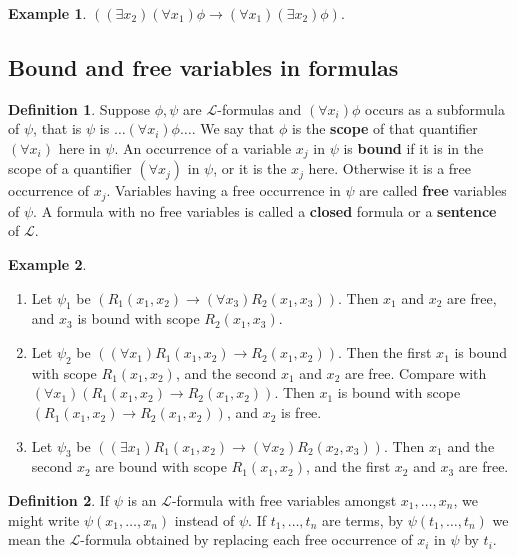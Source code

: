 \documentclass{article}
\renewcommand{\L}{\mathcal{L}}
\newcommand{\rb}[1]{\left( #1 \right)}
\newcommand{\impb}[2]{\rb{#1 \rightarrow #2}}
\newcommand{\fab}[1]{\rb{\forall #1}}
\newcommand{\teb}[1]{\rb{\exists #1}}
\theoremstyle{definition}\newtheorem{definition}{Definition}[subsection]
\theoremstyle{definition}\newtheorem{remark}[definition]{Remark}
\theoremstyle{definition}\newtheorem*{example}{Example}
\theoremstyle{definition}\newtheorem*{note}{Note}
\begin{document}
\begin{example}
$ \impb{\teb{x_2}\fab{x_1}\phi}{\fab{x_1}\teb{x_2}\phi} $.
\end{example}

\subsection{Bound and free variables in formulas}

\begin{definition}
Suppose $ \phi, \psi $ are $ \L $-formulas and $ \fab{x_i}\phi $ occurs as a subformula of $ \psi $, that is $ \psi $ is $ \dots \fab{x_i}\phi \dots $. We say that $ \phi $ is the \textbf{scope} of that quantifier $ \fab{x_i} $ here in $ \psi $. An occurrence of a variable $ x_j $ in $ \psi $ is \textbf{bound} if it is in the scope of a quantifier $ \fab{x_j} $ in $ \psi $, or it is the $ x_j $ here. Otherwise it is a free occurrence of $ x_j $. Variables having a free occurrence in $ \psi $ are called \textbf{free} variables of $ \psi $. A formula with no free variables is called a \textbf{closed} formula or a \textbf{sentence} of $ \L $.
\end{definition}

\begin{example}
\hfill
\begin{enumerate}
\item Let $ \psi_1 $ be $ \impb{R_1\rb{x_1, x_2}}{\fab{x_3}R_2\rb{x_1, x_3}} $. Then $ x_1 $ and $ x_2 $ are free, and $ x_3 $ is bound with scope $ R_2\rb{x_1, x_3} $.
\item Let $ \psi_2 $ be $ \impb{\fab{x_1}R_1\rb{x_1, x_2}}{R_2\rb{x_1, x_2}} $. Then the first $ x_1 $ is bound with scope $ R_1\rb{x_1, x_2} $, and the second $ x_1 $ and $ x_2 $ are free. Compare with $ \fab{x_1}\impb{R_1\rb{x_1, x_2}}{R_2\rb{x_1, x_2}} $. Then $ x_1 $ is bound with scope $ \impb{R_1\rb{x_1, x_2}}{R_2\rb{x_1, x_2}} $, and $ x_2 $ is free.
\item Let $ \psi_3 $ be $ \impb{\teb{x_1}R_1\rb{x_1, x_2}}{\fab{x_2}R_2\rb{x_2, x_3}} $. Then $ x_1 $ and the second $ x_2 $ are bound with scope $ R_1\rb{x_1, x_2} $, and the first $ x_2 $ and $ x_3 $ are free.
\end{enumerate}
\end{example}

\begin{definition}
If $ \psi $ is an $ \L $-formula with free variables amongst $ x_1, \dots, x_n $, we might write $ \psi\rb{x_1, \dots, x_n} $ instead of $ \psi $. If $ t_1, \dots, t_n $ are terms, by $ \psi\rb{t_1, \dots, t_n} $ we mean the $ \L $-formula obtained by replacing each free occurrence of $ x_i $ in $ \psi $ by $ t_i $.
\end{definition}
\end{document}
